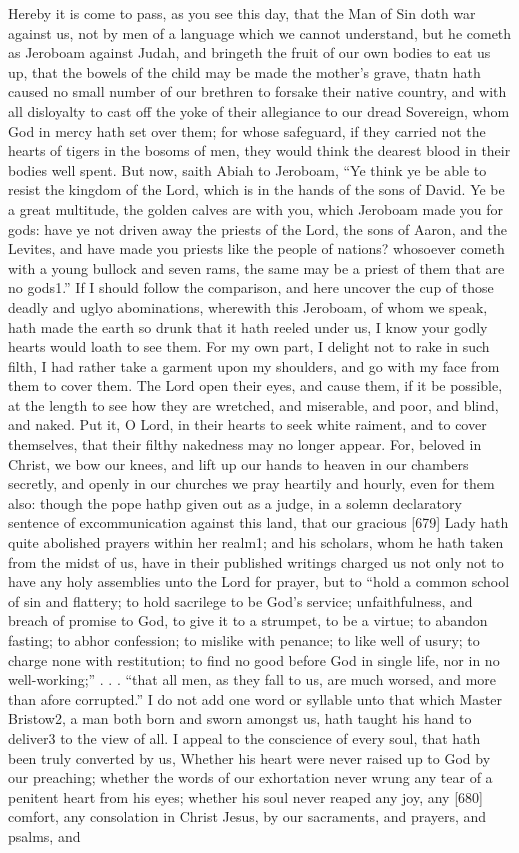Hereby it is come to pass, as you see this day, that the Man of Sin doth war against us, not by men of a language which we cannot understand, but he cometh as Jeroboam against Judah, and bringeth the fruit of our own bodies to eat us up, that the bowels of the child may be made the mother’s grave, thatn hath caused no small number of our brethren to forsake their native country, and with all disloyalty to cast off the yoke of their allegiance to our dread Sovereign, whom God in mercy hath set over them; for whose safeguard, if they carried not the hearts of tigers in the bosoms of men, they would think the dearest blood in their bodies well spent. But now, saith Abiah to Jeroboam, “Ye think ye be able to resist the kingdom of the Lord, which is in the hands of the sons of David. Ye be a great multitude, the golden calves are with you, which Jeroboam made you for gods: have ye not driven away the priests of the Lord, the sons of Aaron, and the Levites, and have made you priests like the people of nations? whosoever cometh with a young bullock and seven rams, the same may be a priest of them that are no gods1.” If I should follow the comparison, and here uncover the cup of those deadly and uglyo abominations, wherewith this Jeroboam, of whom we speak, hath made the earth so drunk that it hath reeled under us, I know your godly hearts would loath to see them. For my own part, I delight not to rake in such filth, I had rather take a garment upon my shoulders, and go with my face from them to cover them. The Lord open their eyes, and cause them, if it be possible, at the length to see how they are wretched, and miserable, and poor, and blind, and naked. Put it, O Lord, in their hearts to seek white raiment, and to cover themselves, that their filthy nakedness may no longer appear. For, beloved in Christ, we bow our knees, and lift up our hands to heaven in our chambers secretly, and openly in our churches we pray heartily and hourly, even for them also: though the pope hathp given out as a judge, in a solemn declaratory sentence of excommunication against this land, that our gracious [679] Lady hath quite abolished prayers within her realm1; and his scholars, whom he hath taken from the midst of us, have in their published writings charged us not only not to have any holy assemblies unto the Lord for prayer, but to “hold a common school of sin and flattery; to hold sacrilege to be God’s service; unfaithfulness, and breach of promise to God, to give it to a strumpet, to be a virtue; to abandon fasting; to abhor confession; to mislike with penance; to like well of usury; to charge none with restitution; to find no good before God in single life, nor in no well-working;” . . . “that all men, as they fall to us, are much worsed, and more than afore corrupted.” I do not add one word or syllable unto that which Master Bristow2, a man both born and sworn amongst us, hath taught his hand to deliver3 to the view of all. I appeal to the conscience of every soul, that hath been truly converted by us, Whether his heart were never raised up to God by our preaching; whether the words of our exhortation never wrung any tear of a penitent heart from his eyes; whether his soul never reaped any joy, any [680] comfort, any consolation in Christ Jesus, by our sacraments, and prayers, and psalms, and 